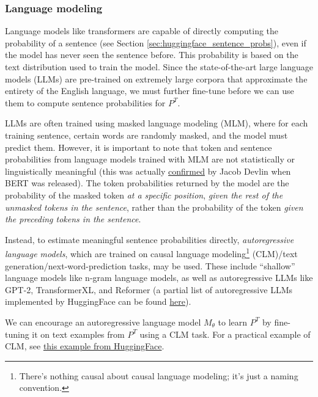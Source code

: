 \documentclass{article}
\begin{document}
\subsubsection{Language modeling}
\label{sec:language_modeling}

Language models like transformers are capable of directly computing the probability of a sentence (see Section \ref{sec:huggingface_sentence_probs}), even if the model has never seen the sentence before. This probability is based on the text distribution used to train the model. Since the state-of-the-art large language models (LLMs) are pre-trained on extremely large corpora that approximate the entirety of the English language, we must further fine-tune before we can use them to compute sentence probabilities for $P^T$.

LLMs are often trained using masked language modeling (MLM), where for each training sentence, certain words are randomly masked, and the model must predict them. However, it is important to note that token and sentence probabilities from language models trained with MLM are not statistically or linguistically meaningful (this was actually \href{https://github.com/google-research/bert/issues/35}{confirmed} by Jacob Devlin when BERT was released). The token probabilities returned by the model are the probability of the masked token \textit{at a specific position}, \textit{given the rest of the unmasked tokens in the sentence}, rather than the probability of the token \textit{given the preceding tokens in the sentence}. 

Instead, to estimate meaningful sentence probabilities directly, \textit{autoregressive language models}, which are trained on causal language modeling\footnote{There's nothing causal about causal language modeling; it's just a naming convention.} (CLM)/text generation/next-word-prediction tasks, may be used. These include ``shallow'' language models like n-gram language models, as well as autoregressive LLMs like GPT-2, TransformerXL, and Reformer (a partial list of autoregressive LLMs implemented by HuggingFace can be found \href{https://web.archive.org/web/20230125132319/https://huggingface.co/docs/transformers/model_summary#autoregressive-models}{here}).

We can encourage an autoregressive language model $M_\theta$ to learn $P^T$ by fine-tuning it on text examples from $P^T$ using a CLM task. For a practical example of CLM, see \href{https://huggingface.co/docs/transformers/tasks/language_modeling}{this example from HuggingFace}.
\end{document}
